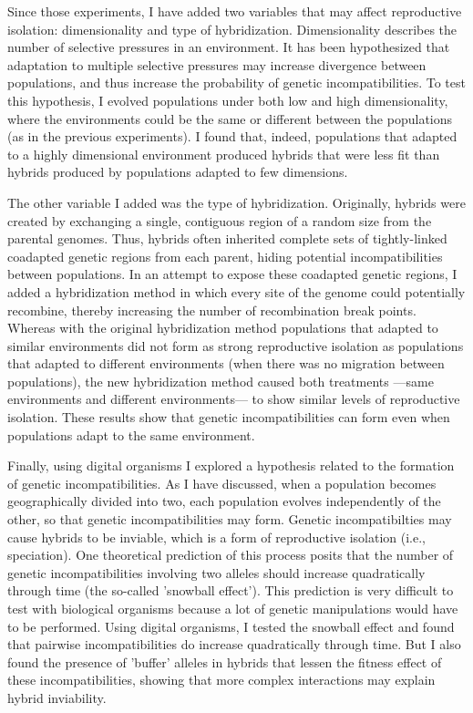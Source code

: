 \documentclass[12pt]{article}
\begin{document}
Since those experiments, I have added two
variables that may affect reproductive isolation:
dimensionality and type of hybridization.
%
Dimensionality describes the number of selective pressures
in an environment.
%
It has been hypothesized that adaptation
to multiple selective pressures may increase divergence
between populations, and thus increase the probability
of genetic incompatibilities.
%
To test this hypothesis, I evolved populations
under both low and high dimensionality,
where the environments could be the same or different
between the populations (as in the previous experiments).
%
I found that, indeed, populations that adapted to a highly
dimensional environment produced hybrids that were less fit
than hybrids produced by populations adapted to few dimensions.



The other variable I added was the type of hybridization.
%
Originally, hybrids were created by exchanging
a single, contiguous region of a random size from the parental genomes.
%
Thus, hybrids often inherited complete sets of
tightly-linked coadapted genetic regions from each parent,
hiding potential incompatibilities between populations.
%
In an attempt to expose these coadapted genetic regions,
I added a hybridization method in which every site of the genome
could potentially recombine, thereby increasing the number
of recombination break points.
%
Whereas with the original hybridization method
populations that adapted to similar environments
did not form as strong reproductive isolation
as populations that adapted to different environments
(when there was no migration between populations),
the new hybridization method caused both treatments%
---same environments and different environments---%
to show similar levels of reproductive isolation.
%
These results show that genetic incompatibilities
can form even when populations adapt to the same environment.



Finally,
using digital organisms I explored a hypothesis
related to the formation of genetic incompatibilities.
%
As I have discussed,
when a population becomes geographically divided into two,
each population evolves independently of the other,
so that genetic incompatibilities may form.
%
Genetic incompatibilties may cause hybrids to be inviable,
which is a form of reproductive isolation (i.e., speciation).
%
One theoretical prediction of this process
posits that the number of genetic incompatibilities
involving two alleles should increase quadratically through time
(the so-called 'snowball effect').
%
This prediction is very difficult to test with biological organisms
because a lot of genetic manipulations would have to be performed.
%
Using digital organisms, I tested the snowball effect
and found that pairwise incompatibilities do increase quadratically
through time.
%
But I also found the presence of 'buffer' alleles in hybrids
that lessen the fitness effect of these incompatibilities,
showing that more complex interactions may explain hybrid inviability.
\end{document}
